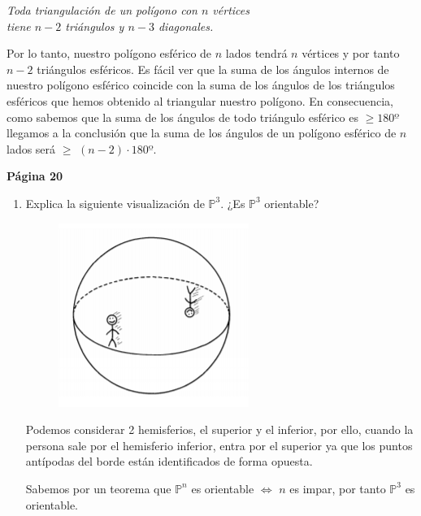 \begin{enumerate}
\begin{center}
\textit{Toda triangulación de un polígono con $n$ vértices\\tiene $n-2$ triángulos y $n-3$ diagonales.}
\end{center}

Por lo tanto, nuestro polígono esférico de $n$ lados tendrá $n$ vértices y por tanto $n-2$ triángulos esféricos. Es fácil ver que la suma de los ángulos internos de nuestro polígono esférico coincide con la suma de los ángulos de los triángulos esféricos que hemos obtenido al triangular nuestro polígono. En consecuencia, como sabemos que la suma de los ángulos de todo triángulo esférico es $\geq180º$ llegamos a la conclusión que la suma de los ángulos de un polígono esférico de $n$ lados será $\geq$ $(n-2) \cdot 180º$.

\end{enumerate}

\vspace{0.5cm}

\textbf{Página 20}

\begin{enumerate}
\item Explica la siguiente visualización de $\mathds{P}^3$. ¿Es $\mathds{P}^3$ orientable?

\begin{figure}[H]
	\centering
	\includegraphics[scale=0.8]{images/geometria_universo/pagina_20_1.png}
\end{figure}

Podemos considerar 2 hemisferios, el superior y el inferior, por ello, cuando la persona sale por el hemisferio inferior, entra por el superior ya que los puntos antípodas del borde están identificados de forma opuesta.

Sabemos por un teorema que $\mathds{P}^n$ es orientable $\Longleftrightarrow$ $n$ es impar, por tanto $\mathds{P}^3$ es orientable.

\end{enumerate}


